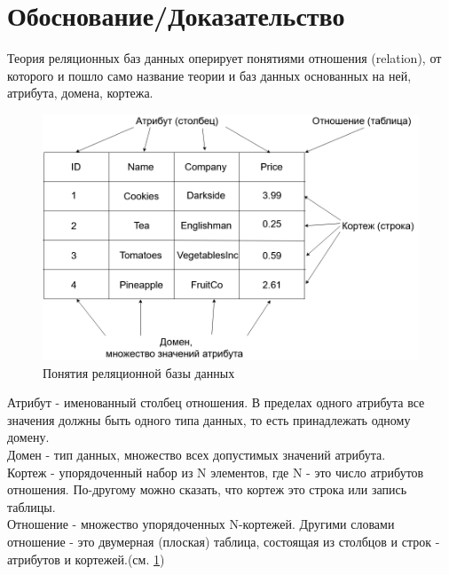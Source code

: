\section*{Обоснование/Доказательство}
\indent Теория реляционных баз данных оперирует понятиями отношения (relation), от которого и пошло само название теории и баз данных основанных на ней, атрибута, домена, кортежа.

\begin{figure}[h]
	\includegraphics[width=\linewidth]{pics/databaseExample.png}
	\caption{Понятия реляционной базы данных}
	\label{fig:dbExample}
	\centering
\end{figure}

\indent Атрибут - именованный столбец отношения.
В пределах одного атрибута все значения должны быть одного типа данных, то есть принадлежать одному домену.\\
\indent Домен - тип данных, множество всех допустимых значений атрибута.\\
\indent Кортеж - упорядоченный набор из N элементов, где N - это число атрибутов отношения.
По-другому можно сказать, что кортеж это строка или запись таблицы.\\
\indent Отношение - множество упорядоченных N-кортежей.
Другими словами отношение - это двумерная (плоская) таблица, состоящая из столбцов и строк - атрибутов и кортежей.(см. \ref{fig:dbExample})\\

